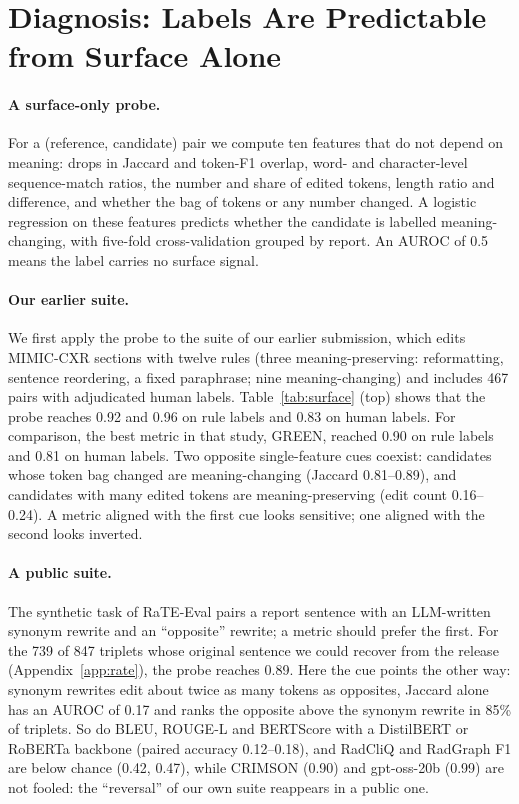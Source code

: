 \documentclass[11pt]{article}
\begin{document}
\section{Diagnosis: Labels Are Predictable from Surface Alone}
\label{sec:diagnosis}

\paragraph{A surface-only probe.}
For a (reference, candidate) pair we compute ten features that do not depend on meaning: drops in Jaccard and token-F1 overlap, word- and character-level sequence-match ratios, the number and share of edited tokens, length ratio and difference, and whether the bag of tokens or any number changed. A logistic regression on these features predicts whether the candidate is labelled meaning-changing, with five-fold cross-validation grouped by report. An AUROC of 0.5 means the label carries no surface signal.

\paragraph{Our earlier suite.}
We first apply the probe to the suite of our earlier submission, which edits MIMIC-CXR sections with twelve rules (three meaning-preserving: reformatting, sentence reordering, a fixed paraphrase; nine meaning-changing) and includes 467 pairs with adjudicated human labels.
Table~\ref{tab:surface} (top) shows that the probe reaches 0.92 and 0.96 on rule labels and 0.83 on human labels.
For comparison, the best metric in that study, GREEN, reached 0.90 on rule labels and 0.81 on human labels.
Two opposite single-feature cues coexist: candidates whose token bag changed are meaning-changing (Jaccard 0.81--0.89), and candidates with many edited tokens are meaning-preserving (edit count 0.16--0.24).
A metric aligned with the first cue looks sensitive; one aligned with the second looks inverted.

\paragraph{A public suite.}
The synthetic task of RaTE-Eval \citep{zhao-etal-2024-ratescore} pairs a report sentence with an LLM-written synonym rewrite and an ``opposite'' rewrite; a metric should prefer the first. For the 739 of 847 triplets whose original sentence we could recover from the release (Appendix~\ref{app:rate}), the probe reaches 0.89. Here the cue points the other way: synonym rewrites edit about twice as many tokens as opposites, Jaccard alone has an AUROC of 0.17 and ranks the opposite above the synonym rewrite in 85\% of triplets. So do BLEU, ROUGE-L and BERTScore with a DistilBERT or RoBERTa backbone (paired accuracy 0.12--0.18), and RadCliQ and RadGraph F1 are below chance (0.42, 0.47), while CRIMSON (0.90) and gpt-oss-20b (0.99) are not fooled: the ``reversal'' of our own suite reappears in a public one.
\end{document}
